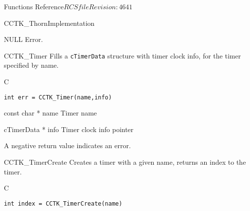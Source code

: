 \begin{cactuspart}{ Functions Reference}{$RCSfile$}{$Revision: 4641 $}
\begin{FunctionDescription}{CCTK\_ThornImplementation}
\begin{ErrorSection}
\begin{Error}{NULL}
Error.
\end{Error}
\end{ErrorSection}

\end{FunctionDescription}



\begin{FunctionDescription}{CCTK\_Timer}
\label{CCTK-Timer}
Fills a {\tt cTimerData}
structure with timer clock info, for the timer specified by name.
\begin{SynopsisSection}
\begin{Synopsis}{C}
\begin{verbatim}
int err = CCTK_Timer(name,info)
\end{verbatim}
\end{Synopsis}
\end{SynopsisSection}

\begin{ParameterSection}
\begin{Parameter} {const char * name}
Timer name
\end{Parameter}

\begin{Parameter} {cTimerData * info}
Timer clock info pointer
\end{Parameter}
\end{ParameterSection}

\begin{ErrorSection}
\begin{Error}
A negative return value indicates an error.
\end{Error}
\end{ErrorSection}
\end{FunctionDescription}

\begin{FunctionDescription}{CCTK\_TimerCreate}
\label{CCTK-TimerCreate}
Creates a timer with a given name,
returns an index to the timer.
\begin{SynopsisSection}
\begin{Synopsis}{C}
\begin{verbatim}
int index = CCTK_TimerCreate(name)
\end{verbatim}
\end{Synopsis}
\end{SynopsisSection}


\end{FunctionDescription}
\end{cactuspart}
